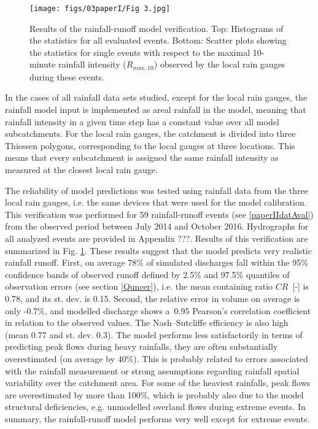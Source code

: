 \documentclass{ctuthesis}\usepackage[]{graphicx}\usepackage[]{color}
\begin{document}
\begin{figure}[h]
\begin{center}
\texttt{[image: figs/03paperI/Fig 3.jpg]}
\caption{Results of the rainfall-runoff model verification. Top: Histograms of the statistics for all evaluated events. Bottom: Scatter plots showing the statistics for single events with respect to the maximal 10-minute rainfall intensity ($R_{max,10}$) observed by the local rain gauges during these events.} \label{3fig3}
\end{center}
\end{figure}

In the cases of all rainfall data sets studied, except for the local rain gauges, the rainfall model input is implemented as areal rainfall in the model, meaning that rainfall intensity in a given time step has a constant value over all model subcatchments. For the local rain gauges, the catchment is divided into three Thiessen polygons, corresponding to the local gauges at three locations. This means that every subcatchment is assigned the same rainfall intensity as measured at the closest local rain gauge.

The reliability of model predictions was tested using rainfall data from the three local rain gauges, i.e. the same devices that were used for the model calibration. This verification was performed for 59 rainfall-runoff events (see \ref{paperIIdatAval}) from the observed period between July 2014 and October 2016. Hydrographs for all analyzed events are provided in Appendix ???.  Results of this verification are summarized in Fig. \ref{3fig3}. These results suggest that the model predicts very realistic rainfall runoff. First, on average 78\% of simulated discharges fall within the 95\% confidence bands of observed runoff defined by 2.5\% and 97.5\% quantiles of observation errors (see section \ref{Quncer}), i.e. the mean containing ratio \mbox{$CR$~[-]} is 0.78, and its st. dev. is 0.15. Second, the relative error in volume on average is only -0.7\%, and modelled discharge shows a~0.95 Pearson's correlation coefficient in relation to the observed values. The Nash–Sutcliffe efficiency is also high (mean 0.77 and st. dev. 0.3). The model performs less satisfactorily in terms of predicting peak flows during heavy rainfalls, they are often substantially overestimated (on average by 40\%). This is probably related to errors associated with the rainfall measurement or strong assumptions regarding rainfall spatial variability over the catchment area. For some of the heaviest rainfalls, peak flows are overestimated by more than 100\%, which is probably also due to the model structural deficiencies, e.g. unmodelled overland flows during extreme events. In summary, the rainfall-runoff model performs very well except for extreme events. 
\end{document}
